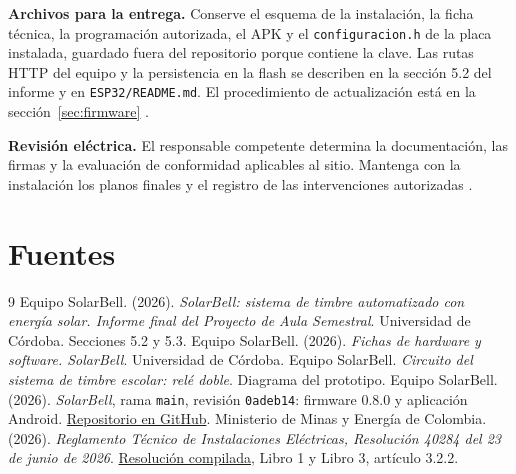 \documentclass[a4paper,11pt]{article}
\newcommand{\pin}[1]{\texttt{#1}}
\begin{document}
\textbf{Archivos para la entrega.} Conserve el esquema de la instalación, la ficha técnica, la programación autorizada, el APK y el \pin{configuracion.h} de la placa instalada, guardado fuera del repositorio porque contiene la clave. Las rutas HTTP del equipo y la persistencia en la flash se describen en la sección 5.2 del informe y en \pin{ESP32/README.md}. El procedimiento de actualización está en la sección~\ref{sec:firmware} \cite{informe,fichas,repo}.

\textbf{Revisión eléctrica.} El responsable competente determina la documentación, las firmas y la evaluación de conformidad aplicables al sitio. Mantenga con la instalación los planos finales y el registro de las intervenciones autorizadas \cite{retie}.

\section{Fuentes}
\begingroup
\small
\renewcommand{\section}[2]{}
\begin{thebibliography}{9}
\setlength{\itemsep}{3pt}
 Equipo SolarBell. (2026). \textit{SolarBell: sistema de timbre automatizado con energía solar. Informe final del Proyecto de Aula Semestral}. Universidad de Córdoba. Secciones 5.2 y 5.3.
 Equipo SolarBell. (2026). \textit{Fichas de hardware y software. SolarBell}. Universidad de Córdoba.
 Equipo SolarBell. \textit{Circuito del sistema de timbre escolar: relé doble}. Diagrama del prototipo.
 Equipo SolarBell. (2026). \textit{SolarBell}, rama \pin{main}, revisión \pin{0adeb14}: firmware 0.8.0 y aplicación Android. \href{https://github.com/AndresOrtizJDK/SolarBell/tree/0adeb14514f4e0b15457052f21800002322fbb43}{Repositorio en GitHub}.
 Ministerio de Minas y Energía de Colombia. (2026). \textit{Reglamento Técnico de Instalaciones Eléctricas, Resolución 40284 del 23 de junio de 2026}. \href{https://minenergia.gov.co/documents/16522/Resolucion-40284-23062026-compilada.pdf}{Resolución compilada}, Libro 1 y Libro 3, artículo 3.2.2.
\end{thebibliography}
\endgroup
\end{document}
